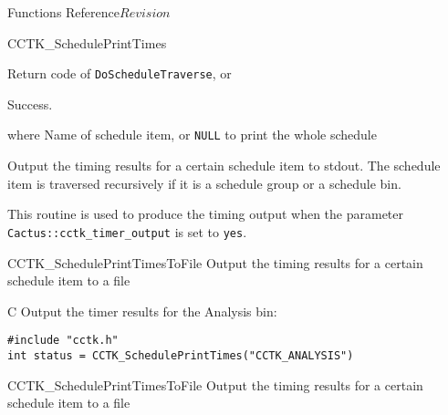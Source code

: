 \begin{cactuspart}{ Functions Reference}{}{$Revision$}
\begin{FunctionDescription}{CCTK\_SchedulePrintTimes}
  \begin{ResultSection}
    \begin{ResultNote}
      Return code of \texttt{DoScheduleTraverse}, or
    \end{ResultNote}
    \begin{Result}{0}
      Success.
    \end{Result}
  \end{ResultSection}
  
  \begin{ParameterSection}
    \begin{Parameter}{where}
      Name of schedule item, or \texttt{NULL} to print the whole
      schedule
    \end{Parameter}
  \end{ParameterSection}
  
  \begin{Discussion}
    Output the timing results for a certain schedule item to stdout.
    The schedule item is traversed recursively if it is a schedule
    group or a schedule bin.
    
    This routine is used to produce the timing output when the
    parameter \texttt{Cactus::cctk\_timer\_output} is set to
    \texttt{yes}.
  \end{Discussion}
  
  \begin{SeeAlsoSection}
    \begin{SeeAlso}{CCTK\_SchedulePrintTimesToFile}
      Output the timing results for a certain schedule item to a file
    \end{SeeAlso}
  \end{SeeAlsoSection}
  
  \begin{ExampleSection}
    \begin{Example}{C}
      Output the timer results for the Analysis bin:
\begin{verbatim}
#include "cctk.h"
int status = CCTK_SchedulePrintTimes("CCTK_ANALYSIS")
\end{verbatim}
\end{Example}
  \end{ExampleSection}
  
\end{FunctionDescription}



\begin{FunctionDescription}{CCTK\_SchedulePrintTimesToFile}
  \label{CCTK-SchedulePrintTimesToFile}
  Output the timing results for a certain schedule item to a file
  

\end{FunctionDescription}
\end{cactuspart}
